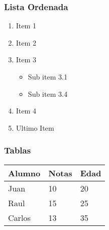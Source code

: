 \documentclass[
]{article}
\providecommand{\tightlist}{%
  \setlength{\itemsep}{0pt}\setlength{\parskip}{0pt}}
\begin{document}
\hypertarget{lista-ordenada}{%
\subsubsection{Lista Ordenada}\label{lista-ordenada}}

\begin{enumerate}
\def\labelenumi{\arabic{enumi}.}
\tightlist
\item
  Item 1
\item
  Item 2
\item
  Item 3

  \begin{itemize}
  \tightlist
  \item
    Sub item 3.1
  \item
    Sub item 3.4
  \end{itemize}
\item
  Item 4
\item
  Ultimo Item
\end{enumerate}

\hypertarget{tablas}{%
\subsubsection{Tablas}\label{tablas}}

\begin{longtable}[]{@{}lll@{}}
\toprule
Alumno & Notas & Edad \\
\midrule
\endhead
Juan & 10 & 20 \\
Raul & 15 & 25 \\
Carlos & 13 & 35 \\
\bottomrule
\end{longtable}
\end{document}
